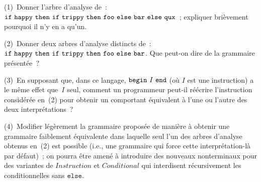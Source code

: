 \documentclass[12pt,a4paper]{article}
\theoremstyle{definition}
\begin{document}
(1) Donner l'arbre d'analyse de :
$\mathtt{if}\penalty0\ \mathtt{happy}\penalty0\ \mathtt{then}\penalty0\ \mathtt{if}\penalty0\ \mathtt{trippy}\penalty0\ \mathtt{then}\penalty0\ \mathtt{foo}\penalty0\ \mathtt{else}\penalty0\ \mathtt{bar}\penalty0\ \mathtt{else}\penalty0\ \mathtt{qux}$ ;
expliquer brièvement pourquoi il n'y en a qu'un.

(2) Donner deux arbres d'analyse distincts de :
$\mathtt{if}\penalty0\ \mathtt{happy}\penalty0\ \mathtt{then}\penalty0\ \mathtt{if}\penalty0\ \mathtt{trippy}\penalty0\ \mathtt{then}\penalty0\ \mathtt{foo}\penalty0\ \mathtt{else}\penalty0\ \mathtt{bar}$.
Que peut-on dire de la grammaire présentée ?

(3) En supposant que, dans ce langage,
$\mathtt{begin}\penalty0\ I\penalty0\ \penalty0\mathtt{end}$ (où $I$
est une instruction) a le même effet que $I$ seul, comment un
programmeur peut-il réécrire l'instruction considérée en (2) pour
obtenir un comportant équivalent à l'une ou l'autre des deux
interprétations ?

(4) Modifier légèrement la grammaire proposée de manière à obtenir une
grammaire faiblement équivalente dans laquelle seul l'un des arbres
d'analyse obtenus en (2) est possible (i.e., une grammaire qui force
cette interprétation-là par défaut) ; on pourra être amené à
introduire des nouveaux nonterminaux pour des variantes de
$\mathit{Instruction}$ et $\mathit{Conditional}$ qui interdisent
récursivement les conditionnelles sans $\mathtt{else}$.
\end{document}
